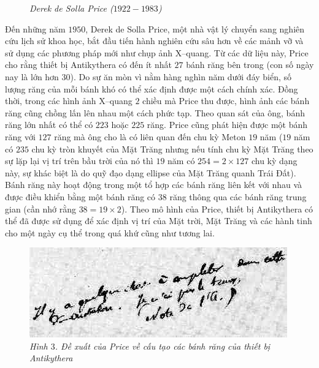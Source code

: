 \begin{multicols}{2}
\begin{figure}[H]
		\caption{\small\textit{\color{lichsutoanhoc}Derek de Solla Price ($1922-1983$)}}
		\vspace*{-10pt}
	\end{figure}
	Đến những năm $1950$, Derek de Solla Price, một nhà vật lý chuyển sang nghiên cứu lịch sử khoa học, bắt đầu tiến hành nghiên cứu sâu hơn về các mảnh vỡ và sử dụng các phương pháp mới như chụp ảnh X--quang. Từ các dữ liệu này, Price cho rằng thiết bị Antikythera có đến ít nhất $27$ bánh răng bên trong (con số ngày nay là lớn hơn $30$). Do sự ăn mòn vì nằm hàng nghìn năm dưới đáy biển, số lượng răng của mỗi bánh khó có thể xác định được một cách chính xác. Đồng thời, trong các hình ảnh X--quang $2$ chiều mà Price thu được, hình ảnh các bánh răng cũng chồng lấn lên nhau một cách phức tạp. Theo quan sát của ông, bánh răng lớn nhất có thể có $223$ hoặc $225$ răng. Price cũng phát hiện được một bánh răng với $127$ răng mà ông cho là có liên quan đến chu kỳ Meton $19$ năm ($19$ năm có $235$ chu kỳ tròn khuyết của Mặt Trăng nhưng nếu tính chu kỳ Mặt Trăng theo sự lặp lại vị trí trên bầu trời của nó thì $19$ năm có $254=2\times127$ chu kỳ dạng này, sự khác biệt là do quỹ đạo dạng ellipse của Mặt Trăng quanh Trái Đất). Bánh răng này hoạt động trong một tổ hợp các bánh răng liên kết với nhau và được điều khiển bằng một bánh răng có $38$ răng thông qua các bánh răng trung gian (cần nhớ rằng $38=19\times2$). Theo mô hình của Price, thiết bị Antikythera có thể đã được sử dụng để xác định vị trí của Mặt trời, Mặt Trăng và các hành tinh cho một ngày cụ thể trong quá khứ cũng như tương lai.
	\begin{figure}[H]
		\vspace*{-5pt}
		\centering
		\captionsetup{labelformat= empty, justification=centering}
		\includegraphics[width= 0.85\linewidth]{4}
		\caption{\small\textit{\color{lichsutoanhoc}Hình $3$. Đề xuất của Price về cấu tạo các bánh răng của thiết bị Antikythera}}
		\vspace*{-5pt}
	\end{figure}

\end{multicols}
